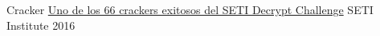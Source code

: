 

\begin{cvhonors}
  \cvhonor
    {Cracker}
    {\href{https://bit.ly/30q2vRb}{Uno de los 66 crackers exitosos del SETI Decrypt Challenge}}
    {SETI Institute}
    {2016}
\end{cvhonors}
